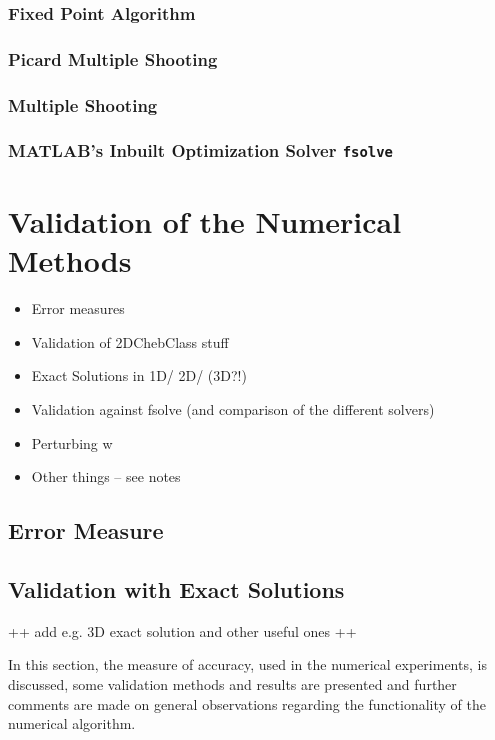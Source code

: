 \documentclass[11pt, a4paper]{article}
\theoremstyle{definition}
\begin{document}
	\subsubsection{Fixed Point Algorithm}\label{sec:Method_SolverFP}	
	
	\subsubsection{Picard Multiple Shooting}
	
	\subsubsection{Multiple Shooting}
	
	\subsubsection{{\scshape MATLAB}'s Inbuilt Optimization Solver \texttt{fsolve}} \label{sec:fsolvedescription}
	
	
	
	
	
	
	
	\section{Validation of the Numerical Methods}
	\begin{itemize}
		\item Error measures
		\item Validation of 2DChebClass stuff
		\item Exact Solutions in 1D/ 2D/ (3D?!)
		\item Validation against fsolve (and comparison of the different solvers)
		\item Perturbing w
		\item Other things -- see notes
	\end{itemize}

	\subsection{Error Measure}\label{sec:ErrorMeasure}
	

	\subsection{Validation with Exact Solutions}
	++ add e.g. 3D exact solution and other useful ones ++
	
	In this section, the measure of accuracy, used in the numerical experiments, is discussed, some validation methods and results are presented and further comments are made on general observations regarding the functionality of the numerical algorithm.
\end{document}
